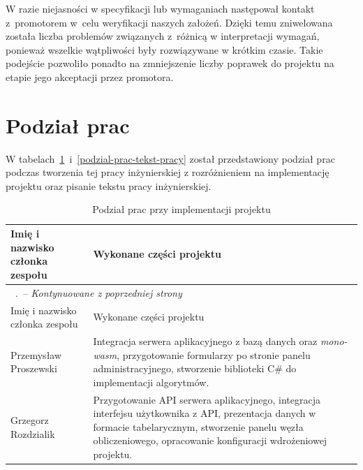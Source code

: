 \documentclass[a4paper,11pt,twoside]{report}
\renewcommand*{\thetable}{\arabic{chapter}.\arabic{table}}
\theoremstyle{definition}
\begin{document}
    W razie niejasności w specyfikacji lub wymaganiach następował kontakt z~promotorem w~celu
    weryfikacji naszych założeń.
    Dzięki temu zniwelowana została liczba problemów związanych z~różnicą w interpretacji wymagań,
    ponieważ wszelkie wątpliwości były rozwiązywane w krótkim czasie.
    Takie podejście pozwoliło ponadto na zmniejszenie liczby poprawek do projektu na etapie jego
    akceptacji przez promotora.

\section{Podział prac}
    \label{podzial-prac}
    
    W tabelach~\ref{podzial-prac-implementacja}~i~\ref{podzial-prac-tekst-pracy} został przedstawiony
    podział prac podczas tworzenia tej pracy inżynierskiej z rozróżnieniem na implementację projektu
    oraz pisanie tekstu pracy inżynierskiej.
    
    \begin{longtable}{| p{} | p{} |}
        \caption{Podział prac przy implementacji projektu}
        \label{podzial-prac-implementacja} \\
        \hline
        Imię i nazwisko członka zespołu & Wykonane części projektu \\ \hline
        \endfirsthead
        \multicolumn{2}{l}{\footnotesize \tablename\ \thetable\ -- \textit{Kontynuowane z poprzedniej strony}} \\
        \hline
        Imię i nazwisko członka zespołu & Wykonane części projektu \\ \hline
        \endhead
        
        Przemysław Proszewski &
        Integracja serwera aplikacyjnego z bazą danych oraz \textit{mono-wasm}, przygotowanie formularzy
        po stronie panelu administracyjnego, stworzenie biblioteki C\# do implementacji algorytmów. \\ \hline
        
        Grzegorz Rozdzialik &
        Przygotowanie API serwera aplikacyjnego, integracja interfejsu użytkownika z API,
        prezentacja danych w formacie tabelarycznym, stworzenie panelu węzła obliczeniowego,
        opracowanie konfiguracji wdrożeniowej projektu. \\ \hline
    \end{longtable}
    
\end{document}
